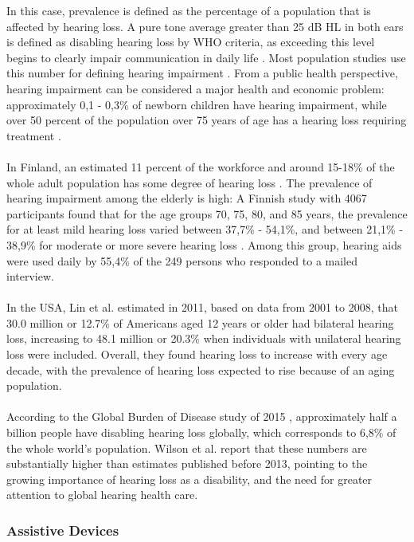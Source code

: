 \documentclass[english, 12pt, a4paper, pdftex, elec, utf8]{aaltothesis}
\begin{document}
In this case, prevalence is defined as the percentage of a population that is affected by hearing loss. A pure tone average greater than 25 dB HL in both ears is defined as disabling hearing loss by WHO criteria, as exceeding this level begins to clearly impair communication in daily life \cite{salonen2013hearing}. Most population studies use this number for defining hearing impairment \cite{salonen2013hearing, lin2011hearing}. From a public health perspective,  hearing impairment can be considered a major health and economic problem: approximately 0,1 - 0,3\% of newborn children have hearing impairment, while over 50 percent of the population over 75 years of age has a hearing loss requiring treatment \cite{salonen2013hearing}.  \\\\
In Finland, an estimated 11 percent of the workforce and around 15-18\% of the whole adult population has some degree of hearing loss \cite{koskela2013kuulokojeen, salonen2013hearing}. The prevalence of hearing impairment among the elderly is high: A Finnish study with 4067 participants found that for the age groups 70, 75, 80, and 85 years, the prevalence for at least mild hearing loss varied between 37,7\% - 54,1\%, and between 21,1\% - 38,9\% for moderate or more severe hearing loss \cite{salonen2013hearing}. Among this group, hearing aids were used daily by 55,4\% of the 249 persons who responded to a mailed interview. \\\\
In the USA, Lin et al. \cite{lin2011hearing} estimated in 2011, based on data from 2001 to 2008, that 30.0 million or 12.7\% of Americans aged 12 years or older had bilateral hearing loss, increasing to 48.1 million or 20.3\% when individuals with unilateral hearing loss were included. Overall, they found hearing loss to increase with every age decade, with the prevalence of hearing loss expected to rise because of an aging population. \\\\
According to the Global Burden of Disease study of 2015 \cite{wilson2017global}, approximately half a billion people have disabling hearing loss globally, which corresponds to 6,8\% of the whole world's population. Wilson et al. \cite{wilson2017global} report that these numbers are substantially higher than estimates published before 2013, pointing to the growing importance of hearing loss as a disability, and the need for greater attention to global hearing health care.

\subsubsection{Assistive Devices}
\end{document}
